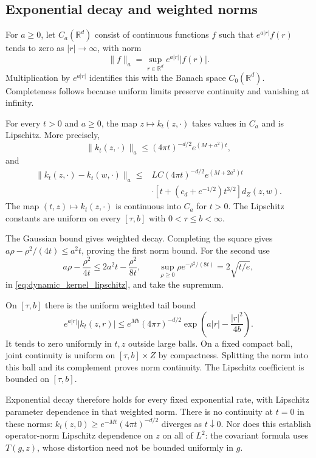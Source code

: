 \subsection{Exponential decay and weighted norms}
For $a\geq0$, let $C_a(\mathbb R^d)$ consist of continuous functions $f$
such that $e^{a|r|}f(r)$ tends to zero as $|r|\to\infty$, with norm
\[
\|f\|_a=\sup_{r\in\mathbb R^d}e^{a|r|}|f(r)|.
\]
Multiplication by $e^{a|r|}$ identifies this with the Banach space
$C_0(\mathbb R^d)$. Completeness follows because uniform limits preserve
continuity and vanishing at infinity.

\begin{corollary}
\label{cor:dynamic_weighted_lipschitz}
For every $t>0$ and $a\geq0$, the map $z\mapsto k_t(z,\cdot)$ takes
values in $C_a$ and is Lipschitz. More precisely,
\[
\|k_t(z,\cdot)\|_a\leq(4\pi t)^{-d/2}e^{(M+a^2)t},
\]
and
\[
\begin{split}
\|k_t(z,\cdot)-k_t(w,\cdot)\|_a
\leq{}&LC(4\pi t)^{-d/2}e^{(M+2a^2)t}\\
&\cdot\left[t+(c_d+e^{-1/2})t^{3/2}\right]d_Z(z,w).
\end{split}
\]
The map $(t,z)\mapsto k_t(z,\cdot)$ is continuous into $C_a$ for $t>0$.
The Lipschitz constants are uniform on every $[\tau,b]$ with
$0<\tau\leq b<\infty$.
\end{corollary}
\Proof
The Gaussian bound gives weighted decay. Completing the square gives
$a\rho-\rho^2/(4t)\leq a^2t$, proving the first norm bound. For the
second use
\[
a\rho-\frac{\rho^2}{4t}\leq2a^2t-\frac{\rho^2}{8t},
\qquad \sup_{\rho\geq0}\rho e^{-\rho^2/(8t)}=2\sqrt{t/e},
\]
in \eqref{eq:dynamic_kernel_lipschitz}, and take the supremum.

On $[\tau,b]$ there is the uniform weighted tail bound
\[
e^{a|r|}|k_t(z,r)|
\leq e^{Mb}(4\pi\tau)^{-d/2}
       \exp\left(a|r|-\frac{|r|^2}{4b}\right).
\]
It tends to zero uniformly in $t,z$ outside large balls. On a fixed
compact ball, joint continuity is uniform on $[\tau,b]\times Z$ by
compactness. Splitting the norm into this ball and its complement proves
norm continuity. The Lipschitz coefficient is bounded on $[\tau,b]$.
\Done

Exponential decay therefore holds for every fixed
exponential rate, with Lipschitz parameter dependence in that weighted
norm. There is no continuity at $t=0$ in these norms:
$k_t(z,0)\geq e^{-Mt}(4\pi t)^{-d/2}$ diverges as $t\downarrow0$.
Nor does this establish operator-norm Lipschitz dependence on $z$ on
all of $L^2$: the covariant formula uses $T(g,z)$, whose distortion
need not be bounded uniformly in $g$.


